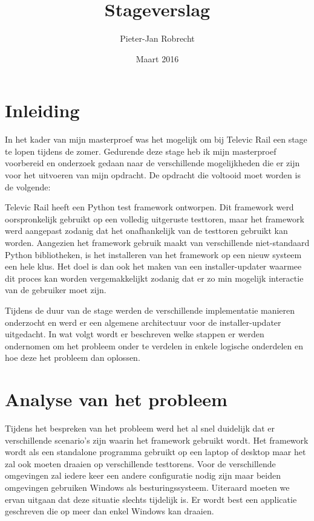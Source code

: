 \documentclass{article}
\title{Stageverslag}
\author{\mbox{Pieter-Jan} Robrecht}
\date{Maart 2016}
\begin{document}


\clearpage
\setcounter{page}{1}

\tableofcontents
\lstlistoflistings

\section{Inleiding}
In het kader van mijn masterproef was het mogelijk om bij Televic Rail een stage te lopen tijdens de zomer. 
Gedurende deze stage heb ik mijn masterproef voorbereid en onderzoek gedaan naar de verschillende mogelijkheden die er zijn voor het uitvoeren van mijn opdracht.
De opdracht die voltooid moet worden is de volgende:

\begin{displayquote}
Televic Rail heeft een Python test framework ontworpen. 
Dit framework werd oorspronkelijk gebruikt op een volledig uitgeruste testtoren, maar het framework werd aangepast zodanig dat het onafhankelijk van de testtoren gebruikt kan worden.
Aangezien het framework gebruik maakt van verschillende niet-standaard Python bibliotheken, is het installeren van het framework op een nieuw systeem een hele klus.
Het doel is dan ook het maken van een installer-updater waarmee dit proces kan worden vergemakkelijkt zodanig dat er zo min mogelijk interactie van de gebruiker moet zijn.
\end{displayquote}

Tijdens de duur van de stage werden de verschillende implementatie manieren onderzocht en werd er een algemene architectuur voor de installer-updater uitgedacht.
In wat volgt wordt er beschreven welke stappen er werden ondernomen om het probleem onder te verdelen in enkele logische onderdelen en hoe deze het probleem dan oplossen. 

\section{Analyse van het probleem}\label{section:analyse}
Tijdens het bespreken van het probleem werd het al snel duidelijk dat er verschillende scenario's zijn waarin het framework gebruikt wordt. 
Het framework wordt als een standalone programma gebruikt op een laptop of desktop maar het zal ook moeten draaien op verschillende testtorens. 
Voor de verschillende omgevingen zal iedere keer een andere configuratie nodig zijn maar beiden omgevingen gebruiken Windows als besturingssysteem.
Uiteraard moeten we ervan uitgaan dat deze situatie slechts tijdelijk is.
Er wordt best een applicatie geschreven die op meer dan enkel Windows kan draaien.
\end{document}
